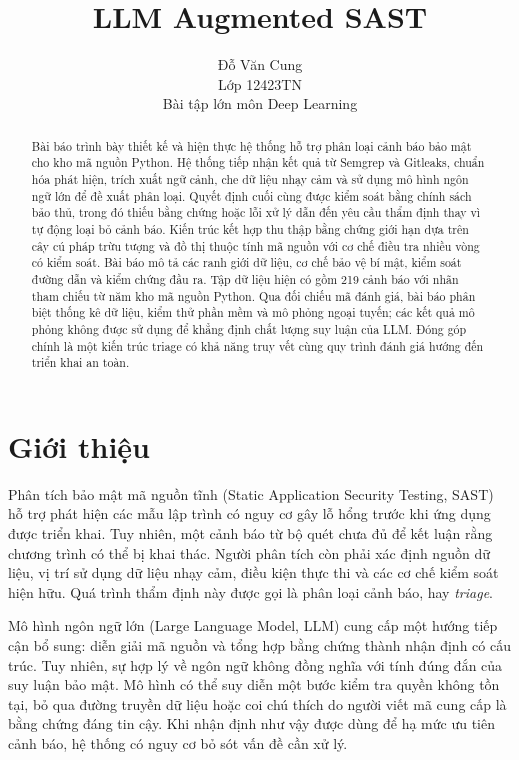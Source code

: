 \documentclass[11pt,a4paper]{article}
\title{LLM Augmented SAST}
\author{Đỗ Văn Cung \\
Lớp 12423TN \\
Bài tập lớn môn Deep Learning}
\begin{document}
\maketitle
\pagestyle{plain}
\thispagestyle{plain}

\renewcommand{\abstractname}{Abstract}
\begin{abstract}
Bài báo trình bày thiết kế và hiện thực hệ thống hỗ trợ phân loại cảnh báo bảo mật cho kho mã nguồn Python. Hệ thống tiếp nhận kết quả từ Semgrep và Gitleaks, chuẩn hóa phát hiện, trích xuất ngữ cảnh, che dữ liệu nhạy cảm và sử dụng mô hình ngôn ngữ lớn để đề xuất phân loại. Quyết định cuối cùng được kiểm soát bằng chính sách bảo thủ, trong đó thiếu bằng chứng hoặc lỗi xử lý dẫn đến yêu cầu thẩm định thay vì tự động loại bỏ cảnh báo. Kiến trúc kết hợp thu thập bằng chứng giới hạn dựa trên cây cú pháp trừu tượng và đồ thị thuộc tính mã nguồn với cơ chế điều tra nhiều vòng có kiểm soát. Bài báo mô tả các ranh giới dữ liệu, cơ chế bảo vệ bí mật, kiểm soát đường dẫn và kiểm chứng đầu ra. Tập dữ liệu hiện có gồm 219 cảnh báo với nhãn tham chiếu từ năm kho mã nguồn Python. Qua đối chiếu mã đánh giá, bài báo phân biệt thống kê dữ liệu, kiểm thử phần mềm và mô phỏng ngoại tuyến; các kết quả mô phỏng không được sử dụng để khẳng định chất lượng suy luận của LLM. Đóng góp chính là một kiến trúc triage có khả năng truy vết cùng quy trình đánh giá hướng đến triển khai an toàn.
\end{abstract}

\section{Giới thiệu}
Phân tích bảo mật mã nguồn tĩnh (Static Application Security Testing, SAST) hỗ trợ phát hiện các mẫu lập trình có nguy cơ gây lỗ hổng trước khi ứng dụng được triển khai. Tuy nhiên, một cảnh báo từ bộ quét chưa đủ để kết luận rằng chương trình có thể bị khai thác. Người phân tích còn phải xác định nguồn dữ liệu, vị trí sử dụng dữ liệu nhạy cảm, điều kiện thực thi và các cơ chế kiểm soát hiện hữu. Quá trình thẩm định này được gọi là phân loại cảnh báo, hay \textit{triage}.

Mô hình ngôn ngữ lớn (Large Language Model, LLM) cung cấp một hướng tiếp cận bổ sung: diễn giải mã nguồn và tổng hợp bằng chứng thành nhận định có cấu trúc. Tuy nhiên, sự hợp lý về ngôn ngữ không đồng nghĩa với tính đúng đắn của suy luận bảo mật. Mô hình có thể suy diễn một bước kiểm tra quyền không tồn tại, bỏ qua đường truyền dữ liệu hoặc coi chú thích do người viết mã cung cấp là bằng chứng đáng tin cậy. Khi nhận định như vậy được dùng để hạ mức ưu tiên cảnh báo, hệ thống có nguy cơ bỏ sót vấn đề cần xử lý.
\end{document}
